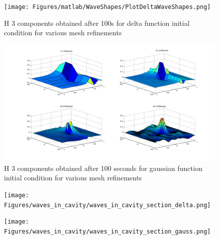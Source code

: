 \begin{figure}
\texttt{[image: Figures/matlab/WaveShapes/PlotDeltaWaveShapes.png]}
\caption{H 3 components obtained after 100s for delta function initial condition for various mesh refinements}
\label{WaveConv7}
\end{figure}

\begin{figure}
\includegraphics[width=\textwidth]{Figures/waves_in_cavity/waves_in_cavity.png}
\caption{H 3 components obtained after 100 seconds for gaussian function initial condition for various mesh refinements}
\label{WaveConv8}
\end{figure}

\begin{figure}
\texttt{[image: Figures/waves\_in\_cavity/waves\_in\_cavity\_section\_delta.png]}
\label{WaveConv9}
\end{figure}

\begin{figure}
\texttt{[image: Figures/waves\_in\_cavity/waves\_in\_cavity\_section\_gauss.png]}
\label{WaveConv10}
\end{figure}








